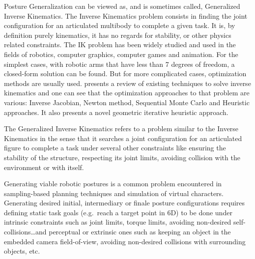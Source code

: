 Posture Generalization can be viewed as, and is sometimes called, Generalized Inverse Kinematics.
The Inverse Kinematics problem consists in finding the joint configuration for an articulated multibody to complete a given task.
It is, by definition purely kinematics, it has no regards for stability, or other physics related constraints.
The IK problem has been widely studied and used in the fields of robotics, computer graphics, computer games and animation.
For the simplest cases, with robotic arms that have less than 7 degrees of freedom, a closed-form solution can be found.
But for more complicated cases, optimization methods are usually used.
\cite{aristidou2009} presents a review of existing techniques to solve inverse kinematics and one can see that the optimization approaches to that problem are various: Inverse Jacobian, Newton method, Sequential Monte Carlo and Heuristic approaches. It also presents a novel geometric iterative heuristic approach.

The Generalized Inverse Kinematics refers to a problem similar to the Inverse Kinematics in the sense that it searches a joint configuration for an articulated figure to complete a task under several other constraints like ensuring the stability of the structure, respecting its joint limits, avoiding collision with the environment or with itself.

Generating viable robotic postures is a common problem encountered in sampling-based planning techniques and simulation of virtual characters.
Generating desired initial, intermediary or finale posture configurations requires defining static task goals (e.g.\ reach a target point in 6D) to be done under intrinsic constraints such as joint limits, torque limits, avoiding non-desired self-collisions\ldots and perceptual or extrinsic ones such as keeping an object in the embedded camera field-of-view, avoiding non-desired collisions with surrounding objects, etc.


